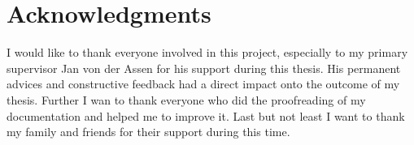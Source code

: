 \chapter*{Acknowledgments}
I would like to thank everyone involved in this project, especially to my primary supervisor Jan von der Assen for his support during this thesis. His permanent advices and constructive feedback had a direct impact onto the outcome of my thesis. Further I wan to thank everyone who did the proofreading of my documentation and helped me to improve it. Last but not least I want to thank my family and friends for their support during this time.